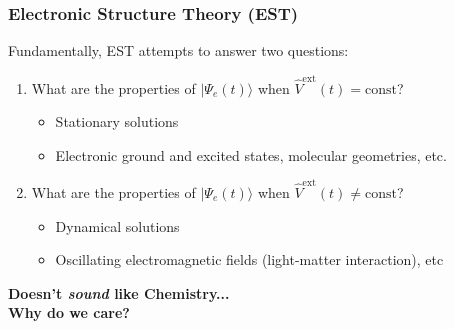 \documentclass[usepdftitle=false]{beamer}
\newcommand{\op}[1]{\hat{#1}}
\newcommand{\ket}[1]{\vert #1 \rangle}         %
\begin{document}
\begin{frame}

  \frametitle{Electronic Structure Theory (EST)}

  Fundamentally, EST attempts to answer two questions:

  \begin{enumerate}

    \item What are the properties of $\ket{\Psi_e(t)}$ when 
      $\op V^\mathrm{ext}(t) = \mathrm{const}$?

    \begin{itemize}
      \item Stationary solutions
      \item Electronic ground and excited states, molecular geometries,
        etc.
    \end{itemize}

    \item What are the properties of $\ket{\Psi_e(t)}$ when 
      $\op V^\mathrm{ext}(t) \neq \mathrm{const}$?
    \begin{itemize}
      \item Dynamical solutions
      \item Oscillating electromagnetic fields (light-matter interaction), etc
    \end{itemize}

  \end{enumerate}

\end{frame}



\begin{frame}

  \begin{center}
    \LARGE \bf Doesn't \emph{sound} like Chemistry...\\ \color{blue} Why do we care?
  \end{center}

\end{frame}
\end{document}
